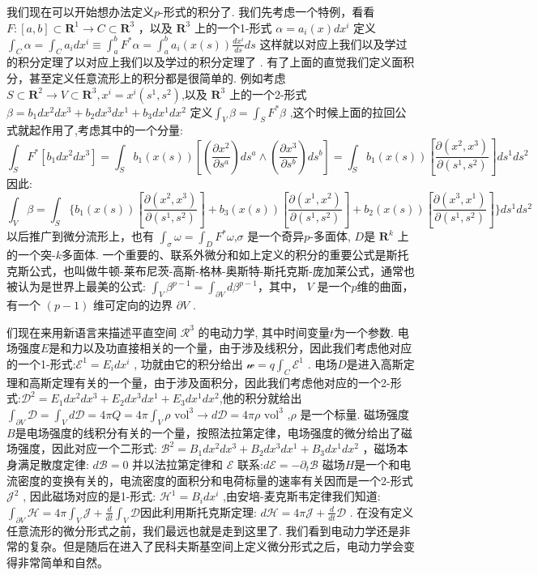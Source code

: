 \documentclass[supercite]{HustGraduPaper}
\begin{document}
\begin{appendices}
		我们现在可以开始想办法定义$p$-形式的积分了. 
		我们先考虑一个特例，看看$ F: [a,b] \subset \mathbf{R}^1 \to C \subset \mathbf{R}^3$ ，以及 $\mathbf{R}^3$ 上的一个1-形式 $\alpha = a_i(x)dx^i$ 
		定义$ \int_C \alpha = \int_C a_i dx^i \equiv \int_a^b F^*\alpha = \int_a^b a_i(x(s))\frac{dx^i}{ds} ds$ 这样就以对应上我们以及学过的积分定理了以对应上我们以及学过的积分定理了 .
		有了上面的直觉我们定义面积分，甚至定义任意流形上的积分都是很简单的.
		例如考虑 $S \subset \mathbf{R}^2 \to V \subset \mathbf{R}^3 , x^i = x^i(s^1,s^2) $,以及 $\mathbf{R}^3$ 上的一个2-形式 $\beta = b_1 dx^2 dx^3 + b_2 dx^3 dx^1 + b_3 dx^1 dx^2 $
		定义$ \int_V \beta = \int_S F^*\beta$ ,这个时候上面的拉回公式就起作用了,考虑其中的一个分量:
		\begin{equation}
		\int_S F^*[b_1 dx^2 dx^3] = \int_S b_1(x(s))[(\frac{\partial x^2}{\partial s ^a})ds^a \wedge (\frac{\partial x^3}{\partial s ^b})ds^b] =\int_S b_1(x(s)) [\frac{\partial(x^2,x^3)}{\partial(s^1,s^2)}] ds^1ds^2   
		\end{equation}
		因此:\begin{equation}
		 \int_V \beta = \int_S\{ b_1(x(s)) [\frac{\partial(x^2,x^3)}{\partial(s^1,s^2)}] + b_3(x(s)) [\frac{\partial(x^1,x^2)}{\partial(s^1,s^2)}] + b_2(x(s)) [\frac{\partial(x^3,x^1)}{\partial(s^1,s^2)}] \} ds^1 ds^2
		\end{equation}
		以后推广到微分流形上，也有 $\int_\sigma \omega = \int_D F^*\omega $,$ \sigma$ 是一个奇异$p$-多面体, $D$是 $\mathbf{R}^k$ 上的一个突-$k$多面体.
		一个重要的、联系外微分和如上定义的积分的重要公式是斯托克斯公式，也叫做牛顿-莱布尼茨-高斯-格林-奥斯特-斯托克斯-庞加莱公式，通常也被认为是世界上最美的公式:
		$\int_V \beta^{p-1} = \int_{\partial V} d\beta^{p-1}$，其中， $V$ 是一个$p$维的曲面，有一个 $(p-1)$ 维可定向的边界 $\partial V$ .
		
		们现在来用新语言来描述平直空间 $\mathcal{R}^3$ 的电动力学, 其中时间变量$t$为一个参数. 
		电场强度$E$是和力以及功直接相关的一个量，由于涉及线积分，因此我们考虑他对应的一个1-形式:$ \mathcal{E}^1 = E_i dx^i$  , 功就由它的积分给出 $\mathcal{w} = q\int_C \mathcal{E}^1$ . 
		电场$D$是进入高斯定理和高斯定理有关的一个量，由于涉及面积分，因此我们考虑他对应的一个2-形式:$ \mathcal{D}^2 = E_1 dx^2 dx^3 + E_2 dx^3 dx^1 + E_3 dx^1 dx^2 $,他的积分就给出 $\int_{\partial V}\mathcal{D} = \int_V d\mathcal{D} = 4\pi Q = 4\pi \int_V \rho \text{ vol}^3 \to d\mathcal{D}  = 4\pi \rho \text{ vol}^3$ ,$ \rho$ 是一个标量.
		磁场强度$B$是电场强度的线积分有关的一个量，按照法拉第定律，电场强度的微分给出了磁场强度，因此对应一个二形式: $\mathcal{B}^2 = B_1 dx^2dx^3 + B_2 dx^3 dx^1 + B_3 dx^1dx^2$ ，磁场本身满足散度定律: $d \mathcal{B} = 0$ 并以法拉第定律和 $\mathcal{E}$ 联系:$ d \mathcal{E} = - \partial_t \mathcal{B} $
		磁场$H$是一个和电流密度的变换有关的，电流密度的面积分和电荷标量的速率有关因而是一个2-形式$ \mathcal{J}^2$ , 因此磁场对应的是1-形式: $\mathcal{H}^1= B_i dx^i$ ,由安培-麦克斯韦定律我们知道:
		$\int_{\partial V} \mathcal{H} = 4\pi \int_V \mathcal{J} + \frac{d}{dt} \int_V \mathcal{D} $因此利用斯托克斯定理: $d \mathcal{H} = 4\pi \mathcal{J} + \frac{d}{dt} \mathcal{D}$ .
		在没有定义任意流形的微分形式之前，我们最远也就是走到这里了. 我们看到电动力学还是非常的复杂。但是随后在进入了民科夫斯基空间上定义微分形式之后，电动力学会变得非常简单和自然。
		

\end{appendices}
\end{document}
